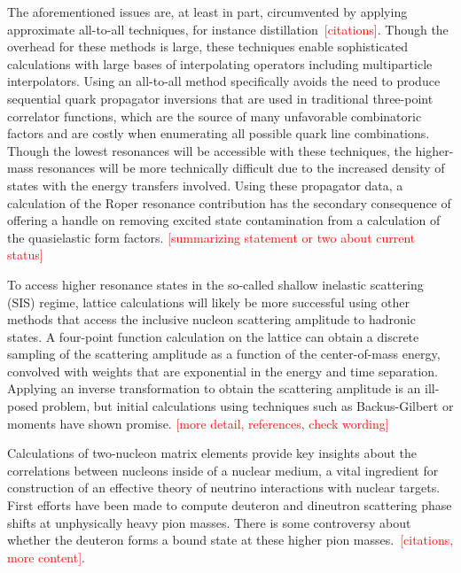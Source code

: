 The aforementioned issues are, at least in part, circumvented by applying approximate
 all-to-all techniques, for instance distillation~\textcolor{red}{[citations]}.
Though the overhead for these methods is large,
 these techniques enable sophisticated calculations with large bases
 of interpolating operators including multiparticle interpolators.
Using an all-to-all method specifically avoids the need to produce sequential
 quark propagator inversions that are used in traditional three-point correlator functions,
 which are the source of many unfavorable combinatoric factors and are
 costly when enumerating all possible quark line combinations.
Though the lowest resonances will be accessible with these techniques,
 the higher-mass resonances will be more technically difficult
 due to the increased density of states with the energy transfers involved.
Using these propagator data, a calculation of the Roper resonance contribution
 has the secondary consequence of offering a handle on removing excited
 state contamination from a calculation of the quasielastic form factors.
\textcolor{red}{[summarizing statement or two about current status]}

To access higher resonance states in the so-called shallow inelastic scattering (SIS) regime,
 lattice calculations will likely be more successful using other methods
 that access the inclusive nucleon scattering amplitude to hadronic states.
A four-point function calculation on the lattice can obtain a discrete sampling
 of the scattering amplitude as a function of the center-of-mass energy,
 convolved with weights that are exponential in the energy and time separation.
Applying an inverse transformation to obtain the scattering amplitude
 is an ill-posed problem, but initial calculations using techniques
 such as Backus-Gilbert or moments have shown promise.
\textcolor{red}{[more detail, references, check wording]}

Calculations of two-nucleon matrix elements provide key insights
 about the correlations between nucleons inside of a nuclear medium,
 a vital ingredient for construction of an effective theory
 of neutrino interactions with nuclear targets.
First efforts have been made to compute deuteron and dineutron scattering phase shifts
 at unphysically heavy pion masses.
There is some controversy about whether the deuteron forms a
 bound state at these higher pion masses.~\textcolor{red}{[citations, more content]}.


